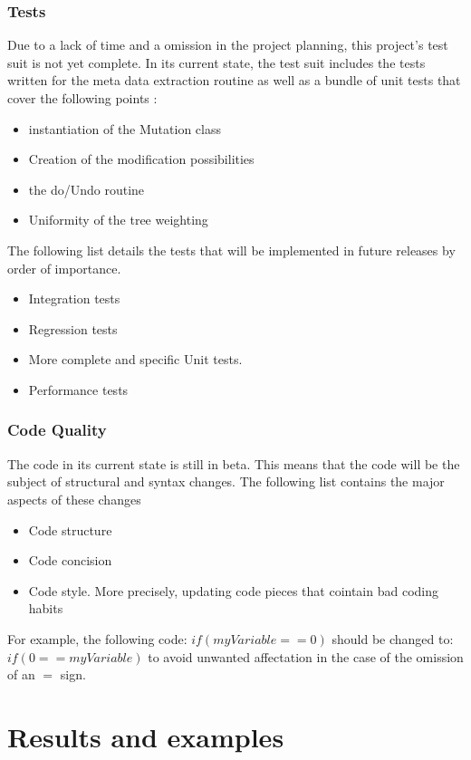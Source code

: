 \documentclass{article}
\begin{document}
\begin{empfile}
			\subsubsection{Tests}
Due to a lack of time and a omission in the project planning, this project's test suit is not yet complete. In its current state, the test suit includes the tests written for the meta data extraction routine as well as a bundle of unit tests that cover the following points :
			\begin{itemize}
			\item{instantiation of the Mutation class}
			\item{Creation of the modification possibilities}
			\item{the do/Undo routine}
			\item{Uniformity of the tree weighting}
			\end{itemize}
			
The following list details the tests that will be implemented in future releases by order of importance.

			\begin{itemize}
			\item{Integration tests}
			\item{Regression tests}
			\item{More complete and specific Unit tests.}
			\item{Performance tests}
			\end{itemize}

			\subsubsection{Code Quality}
The code in its current state is still in beta. This means that the code will be the subject of structural and syntax changes. The following list contains the major aspects of these changes
	
			\begin{itemize}
			\item{Code structure}
			\item{Code concision}
			\item{Code style. More precisely, updating code pieces that cointain bad coding habits}
			\end{itemize}
For example, the following code:
$if(myVariable == 0)$
should be changed to:
$if(0 == myVariable)$
to avoid unwanted affectation in the case of the omission of an $=$ sign. 			
			\clearpage

	\section{Results and examples}

\end{empfile}
\end{document}
